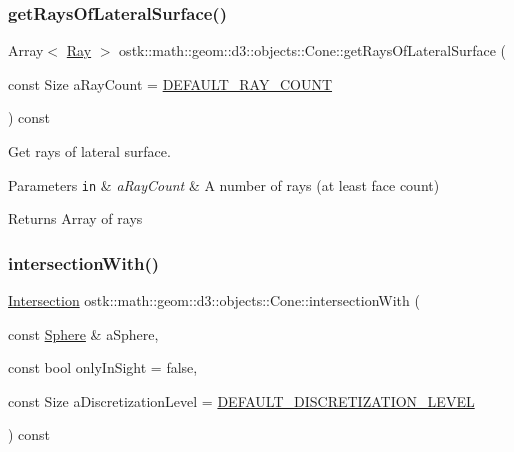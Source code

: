 \subsubsection{\texorpdfstring{get\+Rays\+Of\+Lateral\+Surface()}{getRaysOfLateralSurface()}}
{\footnotesize\ttfamily Array$<$ \hyperlink{classostk_1_1math_1_1geom_1_1d3_1_1objects_1_1_ray}{Ray} $>$ ostk\+::math\+::geom\+::d3\+::objects\+::\+Cone\+::get\+Rays\+Of\+Lateral\+Surface (\begin{DoxyParamCaption}\item[{const Size}]{a\+Ray\+Count = {\ttfamily \hyperlink{_cone_8hpp_a95759f940e1d5e70e977d66fa8fcb5ec}{D\+E\+F\+A\+U\+L\+T\+\_\+\+R\+A\+Y\+\_\+\+C\+O\+U\+NT}} }\end{DoxyParamCaption}) const}



Get rays of lateral surface. 


\begin{DoxyParams}[1]{Parameters}
\mbox{\tt in}  & {\em a\+Ray\+Count} & A number of rays (at least face count) \\
\hline
\end{DoxyParams}
\begin{DoxyReturn}{Returns}
Array of rays 
\end{DoxyReturn}
\mbox{\label{classostk_1_1math_1_1geom_1_1d3_1_1objects_1_1_cone_a28ee89d65bf8a7d03b28c48af68243ad}} 
\subsubsection{\texorpdfstring{intersection\+With()}{intersectionWith()}\hspace{0.1cm}{\footnotesize\ttfamily [1/2]}}
{\footnotesize\ttfamily \hyperlink{classostk_1_1math_1_1geom_1_1d3_1_1_intersection}{Intersection} ostk\+::math\+::geom\+::d3\+::objects\+::\+Cone\+::intersection\+With (\begin{DoxyParamCaption}\item[{const \hyperlink{classostk_1_1math_1_1geom_1_1d3_1_1objects_1_1_sphere}{Sphere} \&}]{a\+Sphere,  }\item[{const bool}]{only\+In\+Sight = {\ttfamily false},  }\item[{const Size}]{a\+Discretization\+Level = {\ttfamily \hyperlink{_pyramid_8hpp_a3eb9931e85ba4c9718113211e549e91d}{D\+E\+F\+A\+U\+L\+T\+\_\+\+D\+I\+S\+C\+R\+E\+T\+I\+Z\+A\+T\+I\+O\+N\+\_\+\+L\+E\+V\+EL}} }\end{DoxyParamCaption}) const}



